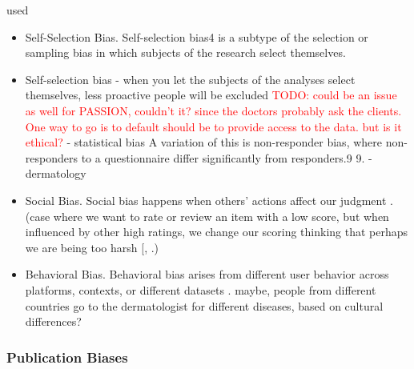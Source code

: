 \documentclass[12pt, a4paper, oneside]{book}   	%
\renewcommand{\todo}[1]{\textcolor{red}{TODO: #1}}
\renewcommand{\paragraph}[1]{%
	\subsubsection*{#1}%
}
\newif\ifrawcitationactive
\newcommand{\rawcitationstart}{
	\color{purple}\rawcitationactivetrue
}
\newcommand{\rawcitationend}{
	\color{black}\rawcitationactivefalse
}
\newcommand{\rawcitationusedstart}{\color{violet}}
\newcommand{\rawcitationusedend}{%
	\ifrawcitationactive
	\color{purple}  %
	\else
	\color{black}  %
	\fi
}
\begin{document}
			\rawcitationstart
			used
			\begin{itemize}		
				\rawcitationusedstart
				\item Self-Selection Bias. Self-selection bias4 is a subtype of the selection or sampling bias in which subjects of the research select themselves. \autocite{Mehrabi_2021}
				\item Self-selection bias - when you let the subjects of the analyses select themselves, less proactive people will be excluded \todo{could be an issue as well for PASSION, couldn't it? since the doctors probably ask the clients. One way to go is to default should be to provide access to the data. but is it ethical?} \autocites{Mester_2022}{Mester_2017}- statistical bias
				A variation of this is non-responder bias, where non-responders to a questionnaire differ significantly from responders.9 9. \autocite{Chakraborty_2024} - dermatology
			
				\item Social Bias. Social bias happens when others’ actions affect our judgment \autocite{M9_Baeza-Yates_2018}. (case where we want to rate or review an item with a low score, but when influenced by other high ratings, we change our scoring thinking that perhaps we are being too harsh [\autocite{M9_Baeza-Yates_2018}, \autocite{M151_Wang_2014}.) \autocite{Mehrabi_2021}

				\item Behavioral Bias. Behavioral bias arises from different user behavior across platforms, contexts, or different datasets \autocite{M120_Olteanu_2019}. \autocite{Mehrabi_2021} maybe, people from different countries go to the dermatologist for different diseases, based on cultural differences?
				\rawcitationusedend
				
			\end{itemize}
			\rawcitationend
			
			\paragraph{Publication Biases}
			
\end{document}
